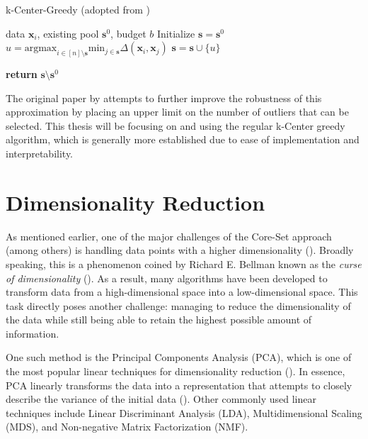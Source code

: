 \documentclass[english,bachelor,ul]{webisthesis} %
\begin{document}
\begin{algorithm}
    \caption{k-Center-Greedy (adopted from \cite{DBLP:conf/iclr/SenerS18})}%
\makeatletter{}\makeatother
\label{alg:coreset}
\begin{algorithmic}


\Require data $ \mathbf{x}_i $, existing pool $ \mathbf{s}^0 $, budget $ b $
\State Initialize $ \mathbf{s} = \mathbf{s}^0 $
\Repeat
\State $ u = \text{argmax}_{i \in [n] \setminus \mathbf{s}} \text{min}_{j \in \mathbf{s}} \Delta(\mathbf{x}_i, \mathbf{x}_j) $
\State $ \mathbf{s} = \mathbf{s} \cup \{u\} $

\State \textbf{return} $\mathbf{s} \setminus \mathbf{s}^0 $
\end{algorithmic}
\end{algorithm}

The original paper by \cite{DBLP:conf/iclr/SenerS18} attempts to further improve the robustness of this approximation by placing an upper limit on the number of outliers that can be selected. This thesis will be focusing on and using the regular k-Center greedy algorithm, which is generally more established due to ease of implementation and interpretability.

\section{Dimensionality Reduction}

As mentioned earlier, one of the major challenges of the Core-Set approach (among others) is handling data points with a higher dimensionality (\cite{DBLP:conf/iccv/SinhaED19}). Broadly speaking, this is a phenomenon coined by Richard E. Bellman known as the \textit{curse of dimensionality} (\cite{franccois2007high}). As a result, many algorithms have been developed to transform data from a high-dimensional space into a low-dimensional space. This task directly poses another challenge: managing to reduce the dimensionality of the data while still being able to retain the highest possible amount of information. 

One such method is the Principal Components Analysis (PCA), which is one of the most popular linear techniques for dimensionality reduction (\cite{van2009dimensionality}). In essence, PCA linearly transforms the data into a representation that attempts to closely describe the variance of the initial data (\cite{jolliffe2016principal}). Other commonly used linear techniques include Linear Discriminant Analysis (LDA), Multidimensional Scaling (MDS), and Non-negative Matrix Factorization (NMF).
\end{document}
